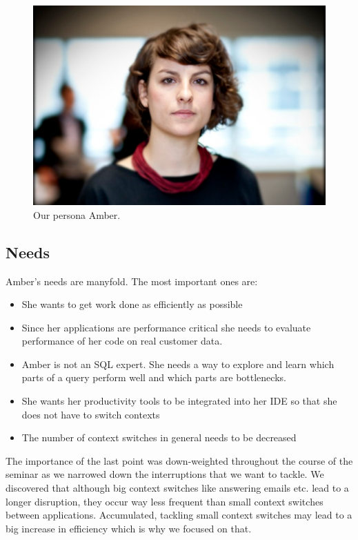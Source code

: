 \begin{figure}
    \includegraphics[width=\linewidth]{images/amber}
    \caption{Our persona Amber.}
    \label{fig:amber}
\end{figure}

\subsection{Needs}
Amber's needs are manyfold. The most important ones are:

\begin{itemize}
	\item She wants to get work done as efficiently as possible
	\item Since her applications are performance critical she needs to evaluate performance of her code on real customer data.
	\item Amber is not an SQL expert. She needs a way to explore and learn which parts of a query perform well and which parts are bottlenecks.
	\item She wants her productivity tools to be integrated into her IDE so that she does not have to switch contexts
	\item The number of context switches in general needs to be decreased
\end{itemize}

The importance of the last point was down-weighted throughout the course of the seminar as we narrowed down the interruptions that we want to tackle. We discovered that although big context switches like answering emails etc. lead to a longer disruption, they occur way less frequent than small context switches between applications. Accumulated, tackling small context switches may lead to a big increase in efficiency which is why we focused on that.  

